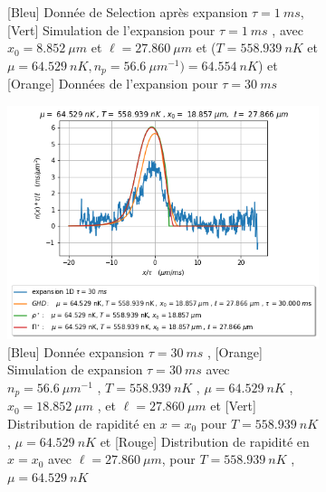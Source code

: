 \documentclass[a3, 10pt,twoside]{article}          %
\theoremstyle{plain}
\theoremstyle{definition}
\theoremstyle{remark}
\theoremstyle{definition} %
\def\OliveGreen{OliveGreen}
\begin{document}
\begin{figure}[H]
\begin{subfigure}[b]{0.45\textwidth}
        		\caption{{\color{blue}[Bleu] Donnée de Selection après expansion $\tau = 1~ms$}, {\color{OliveGreen}[Vert]  Simulation de l'expansion pour $\tau= 1~ms$  , avec $x_0 = 8.852 ~\mu m $ et $\ell = 27.860 ~ \mu m $ et ($T = 558.939 ~nK$ et $\mu=64.529 ~nK  , n_p = 56.6 ~{\mu m}^{-1} )= 64.554~nK$)} et { \color{orange}[Orange] Données de l'expansion pour $\tau = 30~ms$  } }
        		\label{fig1.1:expansion1}
    		\end{subfigure}
    		
    		\vspace{1em}
    		
     		\begin{subfigure}[b]{0.45\textwidth}
        		\centering
        		\includegraphics[width=\textwidth]{Figures/simul_expansion_30_24-04-2024-1.1.png}
        		\caption{{\color{blue}[Bleu] Donnée  expansion $\tau = 30~ms$} , {\color{orange}[Orange] Simulation de  expansion $\tau = 30~ms$ avec $n_p = 56.6 ~{\mu m}^{-1}$ , $T = 558.939 ~nK$ , $\mu=64.529 ~nK$ , $x_0 = 18.852 ~\mu m $ , et $\ell = 27.860 ~ \mu m $} et {\color{\OliveGreen}[Vert] Distribution de rapidité en $x = x_0$ pour  $T = 558.939 ~nK$ , $\mu=64.529 ~nK$} et {\color{red}[Rouge] Distribution de rapidité en $x = x_0$ avec $\ell = 27.860 ~ \mu m $,  pour  $T = 558.939 ~nK$ , $\mu=64.529 ~nK$} }
        		\label{fig1.1:expansion30}
    		\end{subfigure}
    		\hfill
    		\begin{subfigure}[b]{0.45\textwidth}
        		\centering

\end{subfigure}
\end{figure}
\end{document}
